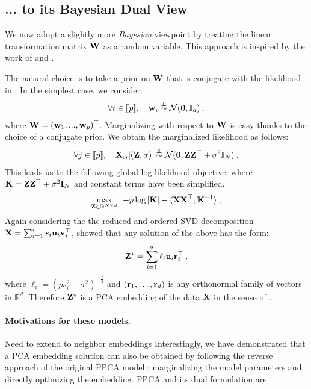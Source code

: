 \subsection{... to its Bayesian Dual View}

We now adopt a slightly more \textit{Bayesian} viewpoint by treating the linear transformation matrix ${\mathbf{W}}$ as a random variable. This approach is inspired by the work of \cite{lawrence2005probabilistic} and \cite{bishop1998bayesian}.

The natural choice is to take a prior on ${\mathbf{W}}$ that is conjugate with the likelihood in . In the simplest case, we consider:
\begin{align}
     \forall i \in {[\![p]\!]}, \quad {\mathbf{w}}_i \stackrel{\perp\!\!\!\!\perp}{\sim} \mathcal{N}(\bm{0}, {\mathbf{I}}_d) \:,
\end{align}
where ${\mathbf{W}} = ({\mathbf{w}}_1, ..., {\mathbf{w}}_p)^\top$. Marginalizing with respect to ${\mathbf{W}}$ is easy thanks to the choice of a conjugate prior. We obtain the marginalized likelihood as follows:
\begin{align}
    \forall j \in {[\![p]\!]}, \quad {\mathbf{X}}_{:j} | ({\mathbf{Z}}, \sigma) \: \stackrel{\perp\!\!\!\!\perp}{\sim} \mathcal{N}(\bm{0}, {\mathbf{Z}} {\mathbf{Z}}^\top + \sigma^2 {\mathbf{I}}_N) \:.
\end{align}
This leads us to the following global log-likelihood objective, where ${\mathbf{K}} = {\mathbf{Z}} {\mathbf{Z}}^\top + \sigma^2 {\mathbf{I}}_N$ and constant terms have been simplified.
\begin{align}
    \max_{{\mathbf{Z}} \in \mathbb{R}^{N \times d}} \:\: -p \log |{\mathbf{K}}| - \langle {\mathbf{X}} {\mathbf{X}}^\top, {\mathbf{K}}^{-1} \rangle \:,
\end{align}
Again considering the the reduced and ordered SVD decomposition ${\mathbf{X}} = \sum_{i=1}^{r} s_i {\mathbf{u}}_i {\mathbf{v}}_i^\top$, \cite{lawrence2005probabilistic} showed that any solution of the above has the form:
\begin{align}
    {\mathbf{Z}}^\star = \sum_{i=1}^d \ell_i {\mathbf{u}}_i {\mathbf{r}}_i^\top \:,
\end{align}
where $\ell_i = (p s_i^2 - \sigma^2)^{-\frac{1}{2}}$ and $({\mathbf{r}}_1, \dots, {\mathbf{r}}_d)$ is any orthonormal family of vectors in $\mathbb{R}^d$.
Therefore ${\mathbf{Z}}^{\star}$ is a PCA embedding of the data ${\mathbf{X}}$ in the sense of .

\paragraph{Motivations for these models.}


\begin{prob}{Need to extend to neighbor embeddings}
    Interestingly, we have demonstrated that a PCA embedding solution can also be obtained by following the reverse approach of the original PPCA model : marginalizing the model parameters and directly optimizing the embedding. PPCA and its dual formulation are 
\end{prob}